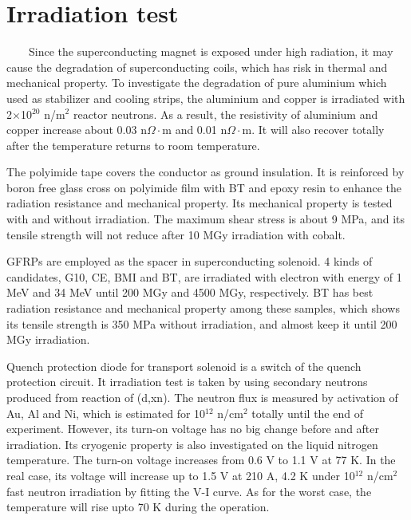 \documentclass[a4paper, 10pt, twocolumn]{article}
\begin{document}
\section{Irradiation test}
~~~~Since the superconducting magnet is exposed under high radiation, it may cause the degradation of superconducting coils, which has risk in thermal and mechanical property.
To investigate the degradation of pure aluminium which used as stabilizer and cooling strips, the aluminium and copper is irradiated with 2$\times$10$^{20}$ n/m$^2$ reactor neutrons.
As a result, the resistivity of aluminium and copper increase about 0.03 n$\Omega\cdot$m and 0.01 n$\Omega\cdot$m.
It will also recover totally after the temperature returns to room temperature.

The polyimide tape covers the conductor as ground insulation.
It is reinforced by boron free glass cross on polyimide film with BT and epoxy resin to enhance the radiation resistance and mechanical property.
Its mechanical property is tested with and without irradiation.
The maximum shear stress is about 9 MPa, and its tensile strength will not reduce after 10 MGy irradiation with cobalt.

GFRPs are employed as the spacer in superconducting solenoid.
4 kinds of candidates, G10, CE, BMI and BT, are irradiated with electron with energy of 1 MeV and 34 MeV until 200 MGy and 4500 MGy, respectively.
BT has best radiation resistance and mechanical property among these samples, which shows its tensile strength is 350 MPa without irradiation, and almost keep it until 200 MGy irradiation.

Quench protection diode for transport solenoid is a switch of the quench protection circuit.
It irradiation test is taken by using secondary neutrons produced from reaction of (d,xn).
The neutron flux is measured by activation of Au, Al and Ni, which is estimated for 10$^{12}$ n/cm$^2$ totally until the end of experiment.
However, its turn-on voltage has no big change before and after irradiation.
Its cryogenic property is also investigated on the liquid nitrogen temperature.
The turn-on voltage increases from 0.6 V to 1.1 V at 77 K.
In the real case, its voltage will increase up to 1.5 V at 210 A, 4.2 K under 10$^{12}$ n/cm$^2$ fast neutron irradiation by fitting the V-I curve.
As for the worst case, the temperature will rise upto 70 K during the operation.
\end{document}
